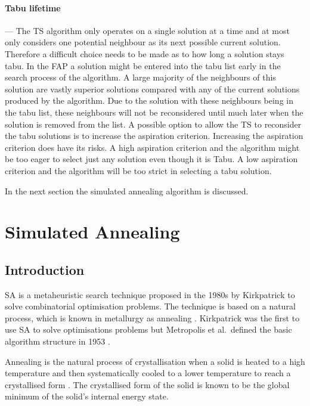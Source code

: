 \paragraph{Tabu lifetime}
--- The \gls{TS} algorithm only operates on a single solution at a time and at most only considers one potential neighbour as its next possible current solution. Therefore a difficult choice needs to be made as to how long a solution stays tabu. In the \gls{FAP} a solution might be entered into the tabu list early in the search process of the algorithm. A large majority of the neighbours of this solution are vastly superior solutions compared with any of the current solutions produced by the algorithm. Due to the solution with these neighbours being in the tabu list, these neighbours will not be reconsidered until much later when the solution is removed from the list. A possible option to allow the \gls{TS} to reconsider the tabu solutions is to increase the aspiration criterion. Increasing the aspiration criterion does have its risks. A high aspiration criterion and the algorithm might be too eager to select just any solution even though it is Tabu. A low aspiration criterion and the algorithm will be too strict in selecting a tabu solution.

In the next section the simulated annealing algorithm is discussed.
\section{Simulated Annealing}
\label{sec:simulatedannealing}

\subsection{Introduction}
\label{sec:SAIntroduction}
\gls{SA} is a metaheuristic search technique proposed in the 1980s by Kirkpatrick to solve combinatorial optimisation problems. The technique is based on a natural process, which is known in metallurgy as annealing \cite{SASingleMultiObj,TempCyclingSA}. Kirkpatrick was the first to use \gls{SA} to solve optimisations problems but Metropolis et al.\ defined the basic algorithm structure in 1953 \cite{CurveFittingSA,VeryFastSAImageEnchancement}.

Annealing is the natural process of crystallisation when a solid is heated to a high temperature and then systematically cooled to a lower temperature to reach a crystallised form \cite{NewSAs,ConstantTempSA}. The crystallised form of the solid is known to be the global minimum of the solid's internal energy state. 

